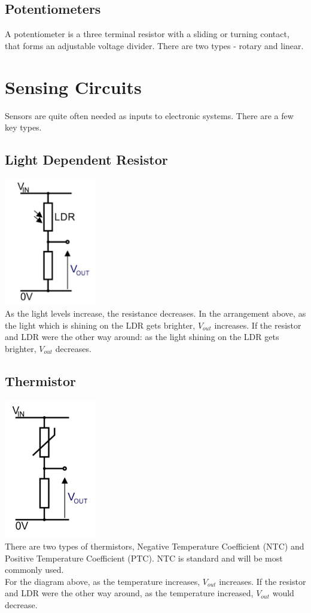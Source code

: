 \documentclass[a4paper,11pt, twocolumn]{article}
\begin{document}
\subsection{Potentiometers}
A potentiometer is a three terminal resistor with a sliding or turning contact, that forms an adjustable voltage divider. There are two types - rotary and linear.

\section{Sensing Circuits}
Sensors are quite often needed as inputs to electronic systems. There are a few key types.
\subsection{Light Dependent Resistor}
\includegraphics[width=0.3\textwidth]{ldr.jpg}\\
As the light levels increase, the resistance decreases. In the arrangement above, as the light which is shining on the LDR gets brighter, $V_{out}$ increases. If the resistor and LDR were the other way around: as the light shining on the LDR gets brighter, $V_{out}$ decreases. 
\subsection{Thermistor}
\includegraphics[width=0.3\textwidth]{thermistor.jpg}\\
There are two types of thermistors, Negative Temperature Coefficient (NTC) and Positive Temperature Coefficient (PTC). NTC is standard and will be most commonly used.\\
For the diagram above, as the temperature increases, $V_{out}$ increases. If the resistor and LDR were the other way around, as the temperature increased, $V_{out}$ would decrease.
\end{document}
